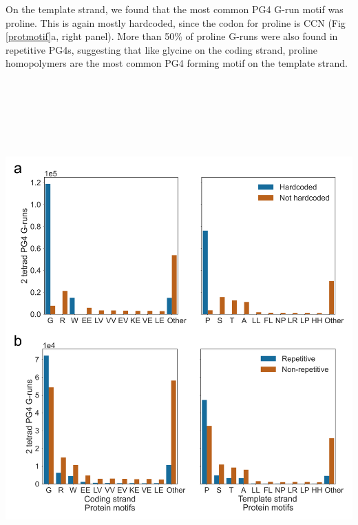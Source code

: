 \documentclass[12pt,a4paper,]{report}
\let\origfigure=\figure
\let\endorigfigure=\endfigure
\renewenvironment{figure}[1][2] {
    \expandafter\origfigure\expandafter[H]
} {
    \endorigfigure
}
\begin{document}
On the template strand, we found that the most common PG4 G-run motif
was proline. This is again mostly hardcoded, since the codon for proline
is CCN (Fig \ref{protmotif}a, right panel). More than 50\% of proline
G-runs were also found in repetitive PG4s, suggesting that like glycine
on the coding strand, proline homopolymers are the most common PG4
forming motif on the template strand.

\newpage

\begin{figure}[htbp]
\centering
\includegraphics[width=\textwidth,height=562pt,keepaspectratio]{chapter_4/figures/pg4_protein_motifs.png}
\caption[Protein motifs that are coded by PG4 G-runs.]{\textbf{Protein   motifs   that   are   coded   by   PG4   G-runs.}   Frequency   plots   showing   the   10   most   common   amino   acids   motifs   which   PG4   G-runs   contribute   to   the   coding   of.   Left   and   right   panels   are   for   coding   and   template   strands,   respectively.   Bars   are   coloured   by   the   frequency   of   \textbf{a)}   hardcoded   and   \textbf{b)}   repetitive   G-runs,   respectively.   \label{protmotif}}
\end{figure}
\end{document}
